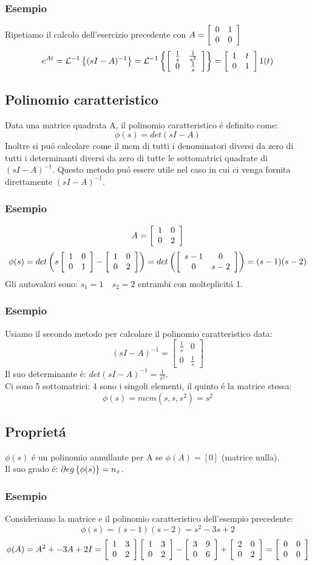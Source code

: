 \documentclass[../main.tex]{subfiles}
\begin{document}
\begin{itemize}
				\subsubsection*{Esempio}
					Ripetiamo il calcolo dell'esercizio precedente con $ A = \left[ \begin{array}{cc} 0 & 1\\ 0 & 0 \end{array} \right] $
					\[ e^{At} = \mathcal{L}^{-1} \left\lbrace (sI-A)^{-1} \right\rbrace = \mathcal{L}^{-1} \left\lbrace \left[ \begin{array}{cc} \frac{1}{s} & \frac{1}{s^2}\\ 0 & \frac{1}{s} \end{array} \right] \right\rbrace = \left[ \begin{array}{cc} 1 & t\\ 0 & 1 \end{array} \right] 1(t) \]
		\end{itemize}
	
	\subsection{Polinomio caratteristico}
		Data una matrice quadrata A, il polinomio caratteristico \'e definito come:
		\[ \phi(s) = det(sI - A) \]
		Inoltre si pu\'o calcolare come il mcm di tutti i denominatori diversi da zero di tutti i determinanti diversi da zero di tutte le sottomatrici quadrate di $ (sI-A)^{-1} $. Questo metodo pu\'o essere utile nel caso in cui ci venga fornita direttamente $ (sI-A)^{-1} $.
	\subsubsection*{Esempio}
		\[ A = \left[ \begin{array}{cc} 1 & 0\\ 0 & 2 \end{array} \right] \]
		\[ \phi(s) = det \left( s \left[ \begin{array}{cc} 1 & 0\\ 0 & 1 \end{array} \right] - \left[ \begin{array}{cc} 1 & 0\\ 0 & 2 \end{array} \right] \right) = det \left( \left[ \begin{array}{cc} s-1 & 0\\ 0 & s-2 \end{array} \right] \right) = (s-1)(s-2) \]
		Gli autovalori sono: $ s_1 = 1 \quad s_2 = 2 $ entrambi con molteplicit\'a 1.
	\subsubsection*{Esempio}
		Usiamo il secondo metodo per calcolare il polinomio caratteristico data:
		\[
			(sI-A)^{-1} =
			\begin{bmatrix}
				\frac{1}{s} & 0\\
				0 & \frac{1}{s}
			\end{bmatrix}
		\]
		Il suo determinante \'e: $ det (sI-A)^{-1} = \frac{1}{s^2} $.\\
		Ci sono 5 sottomatrici: 4 sono i singoli elementi, il quinto \'e la matrice stessa:
		\[ \phi(s) = mcm(s, s, s^2) = s^2 \]
	\subsection*{Propriet\'a}
		$ \phi(s) $ \'e un polinomio annullante per A se $ \phi(A) = [0] $ (matrice nulla).\\
		Il suo grado \'e: $ \partial eg \left\lbrace \phi(s) \right\rbrace = n_x $.
	\subsubsection*{Esempio}
		Consideriamo la matrice e il polinomio caratteristico dell'esempio precedente:
		\[ \phi(s) = (s-1)(s-2) = s^2 - 3s + 2 \]
		\[ \phi(A) = A^2 + -3A + 2I = \left[ \begin{array}{cc} 1 & 3\\ 0 & 2 \end{array} \right] \left[ \begin{array}{cc} 1 & 3\\ 0 & 2 \end{array} \right] - \left[ \begin{array}{cc} 3 & 9\\ 0 & 6 \end{array} \right] + \left[ \begin{array}{cc} 2 & 0\\ 0 & 2 \end{array} \right] = \left[ \begin{array}{cc} 0 & 0\\ 0 & 0 \end{array} \right]\]
		
\end{document}
